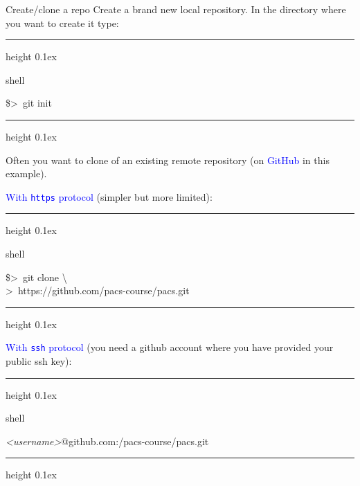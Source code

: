 \documentclass[hyperref={colorlinks}]{beamer}
\newenvironment{shell}{%
\footnotesize\flushleft\hrule height 0.1ex
\tt\begin{beamercolorbox}[sep=1ex,left]{shell}%
}{%
\end{beamercolorbox}
\hrule height 0.1ex
\endflushleft\par
}
\newcommand*{\psone}[1][ant]{\$>~}
\newcommand*{\nl}{\textbackslash\\>~}
\newcommand*{\var}[1]{{\it<#1>}}
\begin{document}
\begin{frame}{Create/clone a repo}
Create a brand new local repository. In the directory where you want to create it type:
\begin{shell}
\psone git init
\end{shell}
\smallskip

Often you want to clone of an existing remote repository (on \textcolor{blue}{GitHub} in this example).
\medskip

\textcolor{blue}{With \texttt{https} protocol} (simpler but more limited):
\begin{shell}
\psone git clone \nl https://github.com/pacs-course/pacs.git
\end{shell}
\textcolor{blue}{With \texttt{ssh} protocol} (you need a github account where you have provided your public ssh key):
\begin{shell}
  \var{username}@github.com:/pacs-course/pacs.git
\end{shell}
\end{frame}
\end{document}
